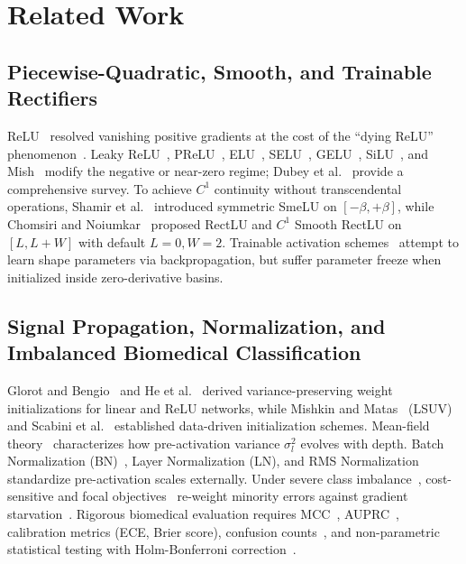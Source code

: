 \documentclass[10pt,a4paper]{article}
\begin{document}
\section{Related Work}
\subsection{Piecewise-Quadratic, Smooth, and Trainable Rectifiers}
ReLU~\cite{nair2010,glorot2011} resolved vanishing positive gradients at the cost of the ``dying ReLU'' phenomenon~\cite{lu2020}. Leaky ReLU~\cite{maas2013}, PReLU~\cite{he2015}, ELU~\cite{clevert2016}, SELU~\cite{klambauer2017}, GELU~\cite{hendrycks2016}, SiLU~\cite{ramachandran2017}, and Mish~\cite{misra2020} modify the negative or near-zero regime; Dubey et al.~\cite{dubey2022} provide a comprehensive survey. To achieve $C^1$ continuity without transcendental operations, Shamir et al.~\cite{shamir2020} introduced symmetric SmeLU on $[-\beta, +\beta]$, while Chomsiri and Noiumkar~\cite{chomsiri2026} proposed RectLU and $C^1$ Smooth RectLU on $[L, L+W]$ with default $L=0, W=2$. Trainable activation schemes~\cite{he2015,apicella2019} attempt to learn shape parameters via backpropagation, but suffer parameter freeze when initialized inside zero-derivative basins.

\subsection{Signal Propagation, Normalization, and Imbalanced Biomedical Classification}
Glorot and Bengio~\cite{glorot2010} and He et al.~\cite{he2015} derived variance-preserving weight initializations for linear and ReLU networks, while Mishkin and Matas~\cite{mishkin2016} (LSUV) and Scabini et al.~\cite{scabini2024} established data-driven initialization schemes. Mean-field theory~\cite{poole2016,schoenholz2017,hayou2019} characterizes how pre-activation variance $\sigma_l^2$ evolves with depth. Batch Normalization (BN)~\cite{ioffe2015}, Layer Normalization (LN), and RMS Normalization standardize pre-activation scales externally. Under severe class imbalance~\cite{johnson2019,buda2018}, cost-sensitive and focal objectives~\cite{lin2017,zhang2019} re-weight minority errors against gradient starvation~\cite{pezeshki2021}. Rigorous biomedical evaluation requires MCC~\cite{chicco2020,boughorbel2017}, AUPRC~\cite{saito2015,davis2006}, calibration metrics (ECE, Brier score), confusion counts~\cite{branco2016}, and non-parametric statistical testing with Holm-Bonferroni correction~\cite{demsar2006}.
\end{document}
